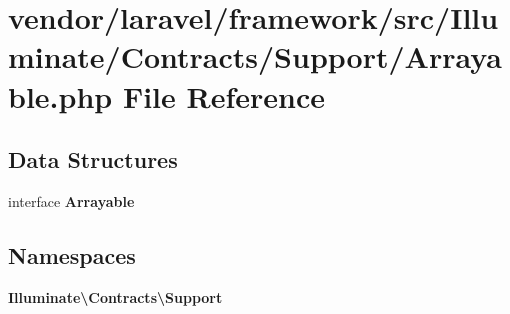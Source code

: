 \section{vendor/laravel/framework/src/\+Illuminate/\+Contracts/\+Support/\+Arrayable.php File Reference}
\label{_arrayable_8php}
\subsection*{Data Structures}
\begin{DoxyCompactItemize}
\item 
interface {\bf Arrayable}
\end{DoxyCompactItemize}
\subsection*{Namespaces}
\begin{DoxyCompactItemize}
\item 
 {\bf Illuminate\textbackslash{}\+Contracts\textbackslash{}\+Support}
\end{DoxyCompactItemize}
